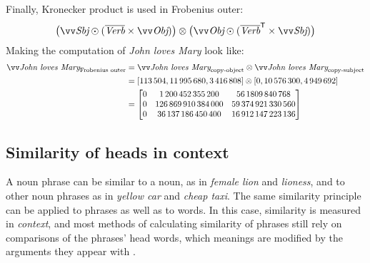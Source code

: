 Finally, Kronecker product is used in Frobenius outer:%
\begin{equation*}
  \big(\ov{\text{\it Sbj}} \odot (\overline{\text{\it Verb}} \times \ov{\text{\it Obj}})\big) \otimes %
  \big(\ov{\text{\it Obj}} \odot (\overline{\text{\it Verb}}^{\mathsf{T}} \times \ov{\text{\it Sbj}})\big)
\end{equation*}
%
Making the computation of \textit{John loves Mary} look like:
\begin{align*}
  \ov{\text{\it John loves Mary}}_{\text{Frobenius outer}} &=  \ov{\text{\it John loves Mary}}_{\text{copy-object}} \otimes \ov{\text{\it John loves Mary}}_{\text{copy-subject}}\\
                                                         &= [113\,504, 11\,995\,680,  3\,416\,808] \otimes [0, 10\,576\,300,  4\,949\,692] \\
                                                           &=%
                                                             \begin{bmatrix}
0 &   1\,200\,452\,355\,200 &      56\,1809\,840\,768 \\
0 & 126\,869\,910\,384\,000 &  59\,374\,921\,330\,560 \\
0 &  36\,137\,186\,450\,400 &  16\,912\,147\,223\,136 \\
                                                             \end{bmatrix}
\end{align*}


\subsection{Similarity of heads in context}
\label{sec:similarity-context}

A noun phrase can be similar to a noun, as in \textit{female lion} and \textit{lioness}, and to other noun phrases as in \textit{yellow car} and \textit{cheap taxi}. The same similarity principle can be applied to phrases as well as to words. In this case, similarity is measured in \emph{context}\footnotemark{}, and most methods of calculating similarity of phrases still rely on comparisons of the phrases' head words, which meanings are modified by the arguments they appear with \cite{Kintsch2001173}.


